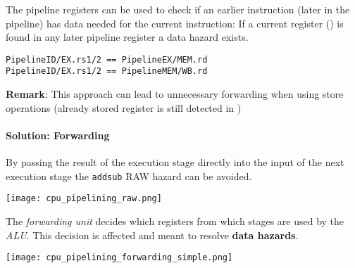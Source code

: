 \newpar{}

The pipeline registers can be used to check if an earlier instruction (later in the pipeline) has data needed for the current instruction:
If a current  register () is found in any later pipeline register a data hazard exists.
\begin{lstlisting}
PipelineID/EX.rs1/2 == PipelineEX/MEM.rd
PipelineID/EX.rs1/2 == PipelineMEM/WB.rd
    \end{lstlisting}
\textbf{Remark}: This approach can lead to unnecessary forwarding when using store operations (already stored register is still detected in )

\paragraph{Solution: Forwarding}
By passing the result of the execution stage directly into the input of the next execution stage the \texttt{add}\textleftarrow\texttt{sub} RAW hazard can be avoided.

\texttt{[image: cpu\_pipelining\_raw.png]}

The \textit{forwarding unit} decides which registers from which stages are used by the \textit{ALU}. This decision is affected and meant to resolve \textbf{data hazards}.

\begin{center}
    \texttt{[image: cpu\_pipelining\_forwarding\_simple.png]}
\end{center}

